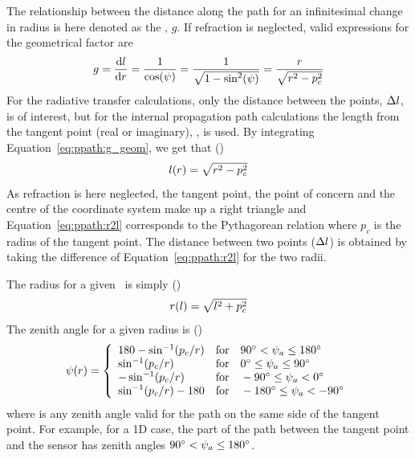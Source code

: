 The relationship between the distance along the path for an
infinitesimal change in radius is here denoted as the
, $g$. If refraction is neglected, valid
expressions for the geometrical factor are
\begin{equation}
  g = \frac{\mathrm{d} l}{\mathrm{d} r} 
           = \frac{1}{\cos(\psi)} = \frac{1}{\sqrt{1-\sin^2(\psi)}}
                                            = \frac{r}{\sqrt{r^2-p_c^2}}
  \label{eq:ppath:g_geom}
\end{equation}
For the radiative transfer calculations, only the distance between the
points, $\Delta l$, is of interest, but for the internal
propagation path calculations the length from the tangent point (real
or imaginary), \PpathLng, is used. By integrating
Equation~\ref{eq:ppath:g_geom}, we get that
()
\begin{equation}
  l(r) = \sqrt{r^2-p_c^2} 
  \label{eq:ppath:r2l}
\end{equation}
As refraction is here neglected, the tangent point, the point of
concern and the centre of the coordinate system make up a right
triangle and Equation~\ref{eq:ppath:r2l} corresponds to the
Pythagorean relation where $p_c$ is the radius of the tangent point.
The distance between two points ($\Delta l$) is obtained by
taking the difference of Equation~\ref{eq:ppath:r2l} for the two
radii.

The radius for a given \PpathLng\ is simply ()
\begin{equation}
  r(l) = \sqrt{l^2+p_c^2} 
  \label{eq:ppath:l2r}
\end{equation}
The zenith angle for a given radius is ()
\begin{equation}
  \psi(r) = \left\{
   \begin{array}{ll}
    180 - \sin^{-1}(p_c/r) & 
                   \textrm{for}\quad 90^\circ < \psi_{a} \leq 180^\circ\\
    \sin^{-1}(p_c/r) & 
                   \textrm{for}\quad 0^\circ \leq \psi_{a} \leq 90^\circ\\
    -\sin^{-1}(p_c/r) & 
                   \textrm{for}\quad -90^\circ \leq \psi_{a} < 0^\circ\\
    \sin^{-1}(p_c/r) - 180 & 
                  \textrm{for}\quad -180^\circ \leq \psi_{a} < -90^\circ\\
   \end{array}   \right.
  \label{eq:ppath:r2psi}
\end{equation}
where  is any zenith angle valid for the path on the same
side of the tangent point. For example, for a 1D case, the part of the
path between the tangent point and the sensor has zenith angles
$90^\circ < \psi_{a} \leq 180^\circ$.

